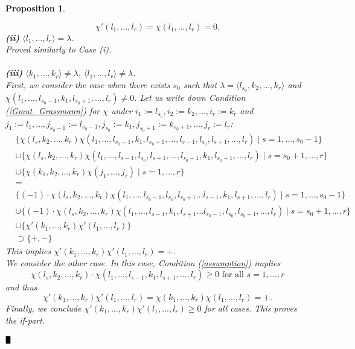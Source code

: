\documentclass{article}
\def\BBox{\rule{2mm}{3mm}}
\def\QED{\hfill$\BBox$}
\newenvironment{proof}
{\begin{rm}\par\smallskip\noindent{\bf Proof.}\quad}{\QED\end{rm}}
\newtheorem{prop}[thm]{\bfseries Proposition} %
\begin{document}
\begin{prop}
\begin{proof}
\[ \chi'(l_1,\dots,l_r) =  \chi (l_1,\dots,l_r) = 0. \]
{\bf (ii)} $\langle l_1,\dots,l_r \rangle = \lambda$.\\
Proved similarly to Case (i).
\\
\\
{\bf (iii)} $\langle k_1,\dots,k_r \rangle \neq \lambda$, $\langle l_1,\dots,l_r \rangle \neq \lambda$.\\
First, we consider the case when there exists $s_0$ such that $ \lambda = \langle l_{s_0},k_2,\dots,k_{r} \rangle$
and $\chi (l_1,\dots,l_{s_0-1},k_1,l_{s_0+1},\dots,l_r) \neq 0$.
Let us write down Condition (\ref{Gmut_Grassmann}) for $\chi$ under $i_1:=l_{s_0},i_2:=k_2,\dots,i_r:=k_r$ 
and $j_1:=l_1,\dots,j_{s_0-1}:=l_{s_0-1},j_{s_0}:=k_1,j_{s_0+1}:=k_{s_0+1},\dots,j_r:=l_r$:
\begin{align*} 
& \{ \chi (l_{s},k_{2},\dots, k_{r})\chi (l_{1},\dots, l_{s_0-1},k_{1},l_{s_0+1},\dots, l_{s-1},l_{s_0},l_{s+1},\dots,l_r) \mid  s=1,...,s_0-1\} \\
& \cup
\{ \chi (l_{s},k_{2},\dots, k_{r})\chi (l_{1},\dots, l_{s-1},l_{s_0},l_{s+1},\dots, l_{s_0-1},k_1,l_{s_0+1},\dots,l_r) \mid  s=s_0+1,...,r\} \\
&\cup
\{ \chi (k_{1},k_{2},\dots, k_{r})\chi (j_{1},\dots, j_{r}) \mid  s=1,...,r\} \\
&= \\
& \{ (-1) \cdot \chi (l_{s},k_{2},\dots, k_{r})\chi (l_{1},\dots, l_{s_0-1},l_{s_0},l_{s_0+1}\dots l_{s-1},k_1,l_{s+1},\dots,l_r) \mid  s=1,...,s_0-1\} \\
& \cup
\{ (-1) \cdot \chi (l_{s},k_{2},\dots, k_{r})\chi (l_{1},\dots, l_{s-1},k_1,l_{s+1}\dots l_{s_0-1},l_{s_0},l_{s_0+1},\dots,l_r) \mid  s=s_0+1,...,r\} \\
&\cup
\{ \chi' (k_{1},\dots, k_{r})\chi' (l_{1},\dots, l_{r}) \} \\
&\supset \{ +,- \} 
\end{align*}
This implies $\chi' (k_{1},\dots, k_{r})\chi' (l_{1},\dots, l_{r}) = +$.
\\
We consider the other case. In this case, Condition (\ref{assumption}) implies
\[ \chi (l_{s},k_{2},\dots,k_{r})\cdot \chi (l_{1},\dots,l_{s-1},k_{1},l_{s+1},\dots,l_{r}) \geq 0 \text{ for all } s=1,\dots,r\]
and thus
\[ \chi' (k_{1},\dots, k_{r})\chi' (l_{1},\dots, l_{r}) = \chi (k_{1},\dots, k_{r})\chi (l_{1},\dots, l_{r}) = +.  \]
Finally, we conclude $\chi' (k_{1},\dots, k_{r})\chi' (l_{1},\dots, l_{r}) \geq 0$ for all cases.
This proves the if-part. 


\end{proof}
\end{prop}
\end{document}
